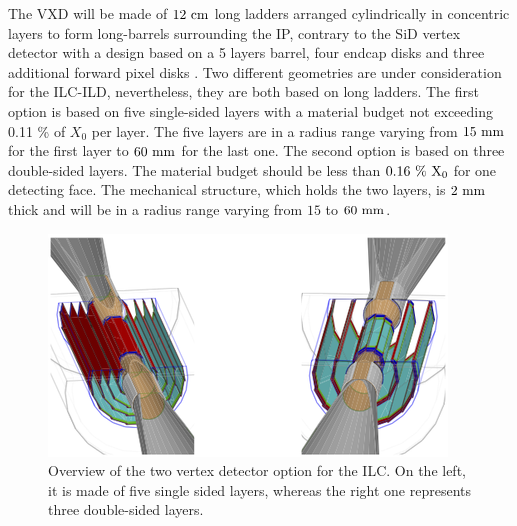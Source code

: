    The \gls{VXD} will be made of $12~\rm{cm}$ long ladders arranged cylindrically in concentric layers to form long-barrels surrounding the \gls{IP}, contrary to the \gls{SiD} vertex detector with a design based on a 5 layers barrel, four endcap disks and three additional forward pixel disks \cite{Behnke2010}.
   Two different geometries are under consideration for the \gls{ILC}-{ILD}, nevertheless, they are both based on long ladders. 
   The first option is based on five single-sided layers with a material budget not exceeding 0.11 \% of $X_0$ per layer.
   The five layers are in a radius range varying from $15~\rm{mm}$ for the first layer to $60~\rm{mm}$ for the last one.
   The second option is based on three double-sided layers.
   The material budget should be less than $0.16~\%~\rm{X_0}$ for one detecting face.
   The mechanical structure, which holds the two layers, is $2~\rm{mm}$ thick and will be in a radius range varying from $15$ to $60~\rm{mm}$.

   
   
   \begin{figure}[!h]
     \centering
     \includegraphics[width = 10 cm]{Pictures/vxd/ild_VXD.png}
     \caption{Overview of the two vertex detector option for the ILC. On the left, it is made of five single sided layers, whereas the right one represents three double-sided layers.}
   \end{figure}
   
